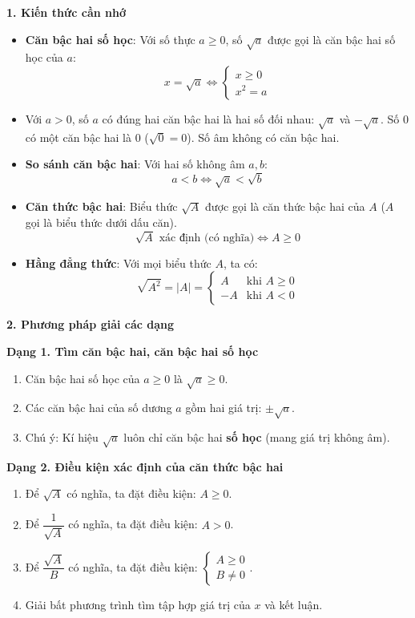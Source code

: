 \textbf{1. Kiến thức cần nhớ}
\begin{itemize}
\item \textbf{Căn bậc hai số học}: Với số thực $a \ge 0$, số $\sqrt{a}$ được gọi là căn bậc hai số học của $a$:
$$\boxed{x = \sqrt{a} \iff \begin{cases} x \ge 0 \\ x^2 = a \end{cases}}$$
\item Với $a > 0$, số $a$ có đúng hai căn bậc hai là hai số đối nhau: $\sqrt{a}$ và $-\sqrt{a}$. Số $0$ có một căn bậc hai là $0$ ($\sqrt{0} = 0$). Số âm không có căn bậc hai.
\item \textbf{So sánh căn bậc hai}: Với hai số không âm $a, b$:
$$\boxed{a < b \iff \sqrt{a} < \sqrt{b}}$$
\item \textbf{Căn thức bậc hai}: Biểu thức $\sqrt{A}$ được gọi là căn thức bậc hai của $A$ ($A$ gọi là biểu thức dưới dấu căn).
$$\boxed{\sqrt{A}\text{ xác định (có nghĩa)} \iff A \ge 0}$$
\item \textbf{Hằng đẳng thức}: Với mọi biểu thức $A$, ta có:
$$\boxed{\sqrt{A^2} = |A| = \begin{cases} A & \text{khi } A \ge 0 \\ -A & \text{khi } A < 0 \end{cases}}$$
\end{itemize}

\textbf{2. Phương pháp giải các dạng}

\textbf{Dạng 1. Tìm căn bậc hai, căn bậc hai số học}
\begin{enumerate}
\item Căn bậc hai số học của $a \ge 0$ là $\sqrt{a} \ge 0$.
\item Các căn bậc hai của số dương $a$ gồm hai giá trị: $\pm \sqrt{a}$.
\item Chú ý: Kí hiệu $\sqrt{a}$ luôn chỉ căn bậc hai \textbf{số học} (mang giá trị không âm).
\end{enumerate}

\textbf{Dạng 2. Điều kiện xác định của căn thức bậc hai}
\begin{enumerate}
\item Để $\sqrt{A}$ có nghĩa, ta đặt điều kiện: $\boxed{A \ge 0}$.
\item Để $\dfrac{1}{\sqrt{A}}$ có nghĩa, ta đặt điều kiện: $\boxed{A > 0}$.
\item Để $\dfrac{\sqrt{A}}{B}$ có nghĩa, ta đặt điều kiện: $\boxed{\begin{cases} A \ge 0 \\ B \ne 0 \end{cases}}$.
\item Giải bất phương trình tìm tập hợp giá trị của $x$ và kết luận.
\end{enumerate}

